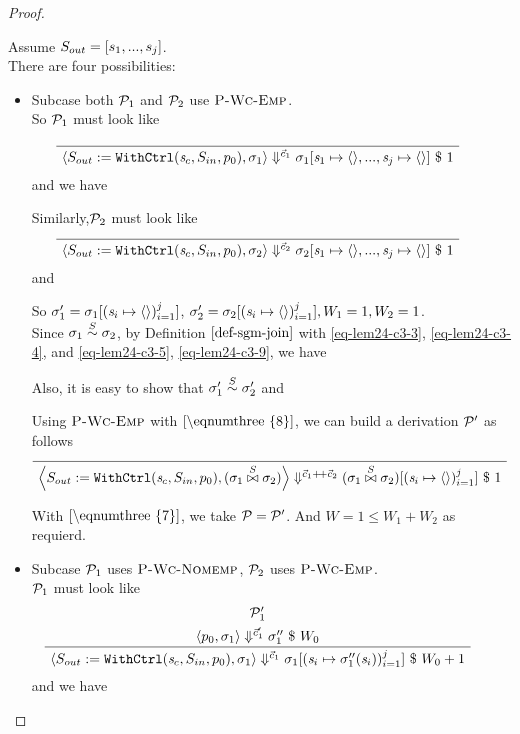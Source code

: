\begin{proof}
\begin{itemize}
    Assume $S_{out} = [s_1,...,s_j]$. \\	
    There are four possibilities: 
   
    \begin{itemize}
    	\item Subcase both $\mathcal{P}_1$ and $\mathcal{P}_2$ use $\textsc{P-Wc-Emp}$. \\
    	
    	So $\mathcal{P}_1$ must look like 
    	
    	$$\PT{
    		\Axiom{\seval{\casethree}{\sgm_1}{\c_1}{\sgm_1[\s_1 \|-> \emptyv, ..., \s_j \|-> \emptyv]}{1}}
    	}$$
    	and we have   
    	
    	Similarly,$\mathcal{P}_2$ must look like  	
    	$$\PT{
    		\Axiom{\seval{\casethree}{\sgm_2}{\c_2}{\sgm_2[\s_1 \|-> \emptyv, ..., \s_j \|-> \emptyv]}{1}}
    	}$$
    	and 
    	
 \def\sgmbe#1{\sgm_#1[\j{\s_i \|-> \emptyv}]}
    	
    	So $\sgm_1' = \sgmbe{1}$, $\sgm_2' = \sgmbe{2}, W_1 = 1, W_2 =1 $. \\
    	
 	Since $\sigma_1 \stackrel{S}{\sim} \sigma_2$, by Definition $\ref{def-sgm-join}$ with \eqref{eq-lem24-c3-3}, \eqref{eq-lem24-c3-4}, and  \eqref{eq-lem24-c3-5}, \eqref{eq-lem24-c3-9}, we have    		
   		
   		Also, it is easy to show that $\sigma'_1 \stackrel{S}{\sim} \sigma'_2$ and 
   	
    Using $\textsc{P-Wc-Emp}$ with $\eqref{\eqnumthree{8}}$, we can build a derivation $\mathcal{P}'$ as follows
   		$$\PT{
   			\Axiom{\seval{\casethree}{\sgmx}{\cc}{\sgmx[\j{\s_i \|-> \emptyv}]}{1}}
   		}$$
   	
   	With $\eqref{\eqnumthree{7}}$, we take $\mathcal{P} = \mathcal{P}'$.
   	And $W = 1 \le W_1 + W_2$ as requierd.
   
\item Subcase $\mathcal{P}_1$ uses  $\textsc{P-Wc-Nomemp}$, $\mathcal{P}_2$ uses $\textsc{P-Wc-Emp}$. \\

  \def\sgmbpp#1{\sgm_{#1}[\j{\s_i \|-> \sgm_{#1}''(\s_i)}]}   	
   	$\mathcal{P}_1$ must look like
   	$$\PT{
   			\UCN{\MP_1'}{\seval{p_0}{\sgm_1}{\c_1'}{\sgm_1''}{W_0}}
   			\UC{\seval{\casethree}{\sgm_1}{\c_1}{\sgmbpp1}{W_0+1}}
   	}$$
    and we have 
   	

\end{itemize}
\end{itemize}
\end{proof}
